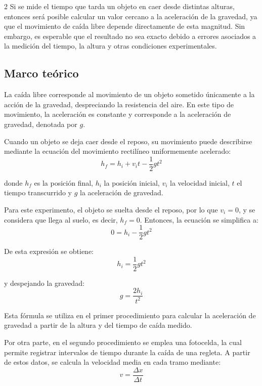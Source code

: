 \documentclass[11pt,letterpaper]{article}
\begin{document}
\begin{multicols}{2}
Si se mide el tiempo que tarda un objeto en caer desde distintas alturas, entonces será posible calcular un valor cercano a la aceleración de la gravedad, ya que el movimiento de caída libre depende directamente de esta magnitud. Sin embargo, es esperable que el resultado no sea exacto debido a errores asociados a la medición del tiempo, la altura y otras condiciones experimentales.

\subsection{Marco teórico}

La caída libre corresponde al movimiento de un objeto sometido únicamente a la acción de la gravedad, despreciando la resistencia del aire. En este tipo de movimiento, la aceleración es constante y corresponde a la aceleración de gravedad, denotada por $g$.

Cuando un objeto se deja caer desde el reposo, su movimiento puede describirse mediante la ecuación del movimiento rectilíneo uniformemente acelerado:
\begin{equation}
h_f = h_i + v_i t - \frac{1}{2}gt^2
\end{equation}

donde $h_f$ es la posición final, $h_i$ la posición inicial, $v_i$ la velocidad inicial, $t$ el tiempo transcurrido y $g$ la aceleración de gravedad.

Para este experimento, el objeto se suelta desde el reposo, por lo que $v_i=0$, y se considera que llega al suelo, es decir, $h_f=0$. Entonces, la ecuación se simplifica a:
\begin{equation}
0 = h_i - \frac{1}{2}gt^2
\end{equation}

De esta expresión se obtiene:
\begin{equation}
h_i = \frac{1}{2}gt^2
\end{equation}

y despejando la gravedad:
\begin{equation}
g = \frac{2h_i}{t^2}
\end{equation}

Esta fórmula se utiliza en el primer procedimiento para calcular la aceleración de gravedad a partir de la altura y del tiempo de caída medido.

Por otra parte, en el segundo procedimiento se emplea una fotocelda, la cual permite registrar intervalos de tiempo durante la caída de una regleta. A partir de estos datos, se calcula la velocidad media en cada tramo mediante:
\begin{equation}
v = \frac{\Delta x}{\Delta t}
\end{equation}


\end{multicols}
\end{document}
